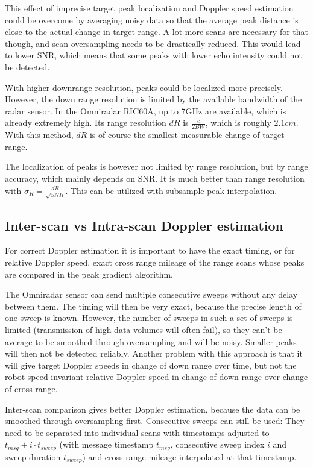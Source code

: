 This effect of imprecise target peak localization and Doppler speed
estimation could be overcome by averaging noisy data so that the average
peak distance is close to the actual change in target range. A lot more
scans are necessary for that though, and scan oversampling needs to be
drastically reduced. This would lead to lower SNR, which means that some
peaks with lower echo intensity could not be detected.

With higher downrange resolution, peaks could be localized more
precisely. However, the down range resolution is limited by the
available bandwidth of the radar sensor. In the Omniradar RIC60A, up to
7GHz are available, which is already extremely high. Its range
resolution \(dR\) is \(\frac{c}{2 BW}\), which is roughly \(2.1cm\). With
this method, \(dR\) is of course the smallest measurable change of
target range.

The localization of peaks is however not limited by range resolution,
but by range accuracy, which mainly depends on SNR. It is much better
than range resolution with \(\sigma_R = \frac{dR}{\sqrt{SNR}}\). This
can be utilized with subsample peak interpolation.

\subsection{Inter-scan vs Intra-scan Doppler
estimation}\label{inter-scan-vs-intra-scan-doppler-estimation}

For correct Doppler estimation it is important to have the exact timing,
or for relative Doppler speed, exact cross range mileage of the range
scans whose peaks are compared in the peak gradient algorithm.

The Omniradar sensor can send multiple consecutive sweeps without any
delay between them. The timing will then be very exact, because the
precise length of one sweep is known. However, the number of sweeps in
such a set of sweeps is limited (transmission of high data volumes will
often fail), so they can't be average to be smoothed through
oversampling and will be noisy. Smaller peaks will then not be detected
reliably. Another problem with this approach is that it will give target
Doppler speeds in change of down range over time, but not the robot
speed-invariant relative Doppler speed in change of down range over
change of cross range.

Inter-scan comparison gives better Doppler estimation, because the data
can be smoothed through oversampling first. Consecutive sweeps can still
be used: They need to be separated into individual scans with timestamps
adjusted to \(t_{msg} + i\cdot t_{sweep}\) (with message timestamp
\(t_{msg}\), consecutive sweep index \(i\) and sweep duration
\(t_{sweep}\)) and cross range mileage interpolated at that timestamp.

